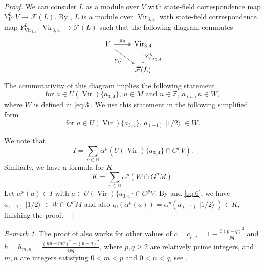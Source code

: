 \documentclass[a4paper, 12pt, reqno]{amsart}
\theoremstyle{remark}
\newtheorem{remark}[theorem]{Remark}
\DeclareMathOperator{\Vir}{Vir}
\DeclareMathOperator{\vachalf}{|1/2\rangle}
\begin{document}
\begin{proof}
  We can consider $L$ as a module over $V$ with state-field correspondence map $Y^L_{V}: V \to \mathcal{F}(L)$.
  By \cite[Theorem 4.2]{wang_rationality_1993}, $L$ is a module over $\Vir_{3,4}$ with state-field correspondence map $Y^L_{\Vir_{3, 4}}: \Vir_{3, 4} \to \mathcal{F}(L)$ such that the following diagram commutes
  \begin{equation*}
    \begin{tikzcd}
      V \arrow[r, "\pi_0", two heads] \arrow[rd, "{Y^{L}_{V}}"'] & {\Vir_{3, 4}} \arrow[d, "{Y^{L}_{\Vir_{3, 4}}}"] \\
      & {\mathcal{F}(L)}
    \end{tikzcd}
  \end{equation*}
  The commutativity of this diagram implies the following statement
  \begin{equation*}
    \text{for $a \in U(\Vir)\{a_{3, 4}\}$, $u \in M$ and $n \in \mathbb{Z}$, $a_{(n)}u \in W$},
  \end{equation*}
  where $W$ is defined in \eqref{eq:3}.
  We use this statement in the following simplified form
  \begin{equation}
    \label{eq:6}
    \text{for $a \in U(\Vir)\{a_{3, 4}\}$, $a_{(-1)}\vachalf \in W$}.
  \end{equation}

  We note that
  \begin{equation*}
    I = \sum_{p \in \mathbb{N}}\alpha^p(U(\Vir)\{a_{3, 4}\} \cap G^pV).
  \end{equation*}
  Similarly, we have a formula for $K$
  \begin{equation*}
    K = \sum_{p \in \mathbb{N}}\alpha^p(W \cap G^pM).
  \end{equation*}
  Let $\alpha^p(a) \in I$ with $a \in U(\Vir)\{a_{3, 4}\} \cap G^pV$.
  By  and \eqref{eq:6}, we have $a_{(-1)}\vachalf \in W \cap G^pM$ and also $\iota_0(\alpha^p(a)) = \alpha^p(a_{(-1)}\vachalf) \in K$, finishing the proof.
\end{proof}

\begin{remark}
  \label{rmk:5}
  The proof of  also works for other values of $c = c_{p, q} = 1 - \frac{6(p - q)^2}{pq}$ and $h = h_{m, n} = \frac{(np - mq)^2 - (p - q)^2}{4pq}$, where $p, q \ge 2$ are relatively prime integers, and $m, n$ are integers satisfying $0 < m < p$ and $0 < n < q$, see \cite{wang_rationality_1993}.
\end{remark}
\end{document}
